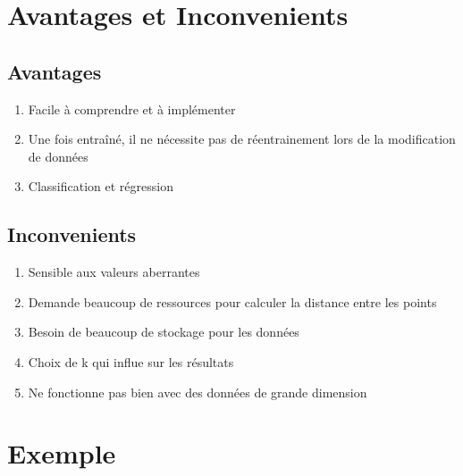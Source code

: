 \documentclass[a0,portrait]{a0poster}
\begin{document}

\section*{Avantages et Inconvenients}


\subsection*{Avantages}

\begin{enumerate}
    \item Facile à comprendre et à implémenter
    \item Une fois entraîné, il ne nécessite pas de réentrainement lors de la modification de données
    \item Classification et régression
\end{enumerate}

\subsection*{Inconvenients}

\begin{enumerate}
    \item Sensible aux valeurs aberrantes
    \item Demande beaucoup de ressources pour calculer la distance entre les points
    \item Besoin de beaucoup de stockage pour les données
    \item Choix de k qui influe sur les résultats
    \item Ne fonctionne pas bien avec des données de grande dimension
\end{enumerate}


\section*{Exemple}
\end{document}
